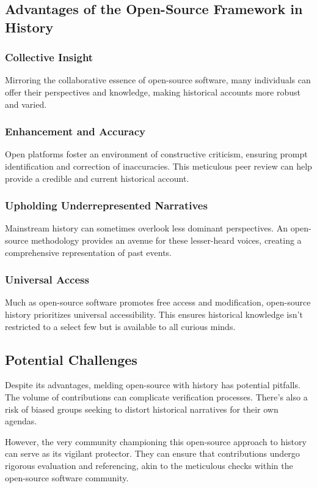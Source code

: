 \documentclass{book}
\begin{document}
\subsection*{Advantages of the Open-Source Framework in History}
\subsubsection*{Collective Insight}
Mirroring the collaborative essence of open-source software, many individuals can offer their perspectives and knowledge, making historical accounts more robust and varied.

\subsubsection*{Enhancement and Accuracy}
Open platforms foster an environment of constructive criticism, ensuring prompt identification and correction of inaccuracies. This meticulous peer review can help provide a credible and current historical account.

\subsubsection*{Upholding Underrepresented Narratives}
Mainstream history can sometimes overlook less dominant perspectives. An open-source methodology provides an avenue for these lesser-heard voices, creating a comprehensive representation of past events.

\subsubsection*{Universal Access}
Much as open-source software promotes free access and modification, open-source history prioritizes universal accessibility. This ensures historical knowledge isn't restricted to a select few but is available to all curious minds.

\subsection*{Potential Challenges}
Despite its advantages, melding open-source with history has potential pitfalls. The volume of contributions can complicate verification processes. There's also a risk of biased groups seeking to distort historical narratives for their own agendas.

However, the very community championing this open-source approach to history can serve as its vigilant protector. They can ensure that contributions undergo rigorous evaluation and referencing, akin to the meticulous checks within the open-source software community.
\end{document}
